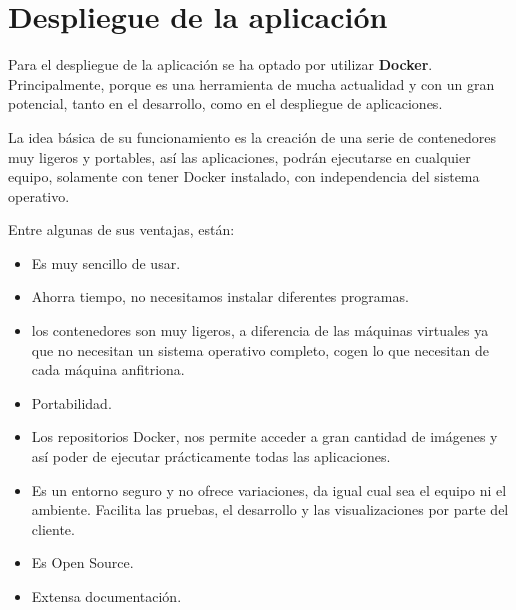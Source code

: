 \section{Despliegue de la aplicación}

Para el despliegue de la aplicación se ha optado por utilizar \textbf{Docker}. Principalmente, porque es una herramienta de mucha actualidad y con un gran potencial, tanto en el desarrollo, como en el despliegue de aplicaciones.

La idea básica de su funcionamiento es la creación de una serie de contenedores muy ligeros y portables, así las aplicaciones, podrán ejecutarse en cualquier equipo, solamente con tener Docker instalado, con independencia del sistema operativo.

Entre algunas de sus ventajas, están:

\begin{itemize}
\item Es muy sencillo de usar.
\item Ahorra tiempo, no necesitamos instalar diferentes programas.
\item los contenedores son muy ligeros, a diferencia de las máquinas virtuales ya que no necesitan un sistema operativo completo, cogen lo que necesitan de cada máquina anfitriona.
\item Portabilidad.
\item Los repositorios Docker, nos permite acceder a gran cantidad de imágenes y así poder de ejecutar prácticamente todas las aplicaciones.
\item Es un entorno seguro y no ofrece variaciones, da igual cual sea el equipo ni el ambiente. Facilita las pruebas, el desarrollo y las visualizaciones por parte del cliente.
\item Es Open Source.
\item Extensa documentación.
\end{itemize}
